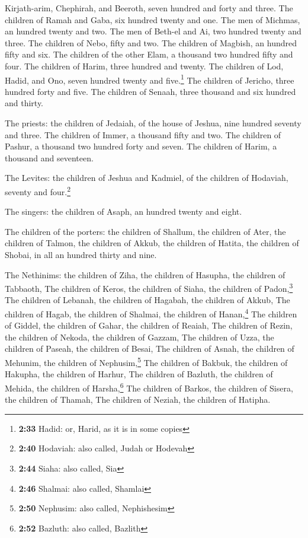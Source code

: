 Kirjath-arim, Chephirah, and Beeroth, seven hundred and forty and three.
 The children of Ramah and Gaba, six hundred twenty and
one.  The men of Michmas, an hundred twenty and two.
 The men of Beth-el and Ai, two hundred twenty and three.
 The children of Nebo, fifty and two.  The
children of Magbish, an hundred fifty and six.  The
children of the other Elam, a thousand two hundred fifty and four.
 The children of Harim, three hundred and twenty.
 The children of Lod, Hadid, and Ono, seven hundred
twenty and five.\footnote{\textbf{2:33} Hadid: or, Harid, as it is in
  some copies}  The children of Jericho, three hundred
forty and five.  The children of Senaah, three thousand
and six hundred and thirty.

 The priests: the children of Jedaiah, of the house of
Jeshua, nine hundred seventy and three.  The children of
Immer, a thousand fifty and two.  The children of Pashur,
a thousand two hundred forty and seven.  The children of
Harim, a thousand and seventeen.

 The Levites: the children of Jeshua and Kadmiel, of the
children of Hodaviah, seventy and four.\footnote{\textbf{2:40} Hodaviah:
  also called, Judah or Hodevah}

 The singers: the children of Asaph, an hundred twenty
and eight.

 The children of the porters: the children of Shallum,
the children of Ater, the children of Talmon, the children of Akkub, the
children of Hatita, the children of Shobai, in all an hundred thirty and
nine.

 The Nethinims: the children of Ziha, the children of
Hasupha, the children of Tabbaoth,  The children of
Keros, the children of Siaha, the children of Padon,\footnote{\textbf{2:44}
  Siaha: also called, Sia}  The children of Lebanah, the
children of Hagabah, the children of Akkub,  The children
of Hagab, the children of Shalmai, the children of Hanan,\footnote{\textbf{2:46}
  Shalmai: also called, Shamlai}  The children of Giddel,
the children of Gahar, the children of Reaiah,  The
children of Rezin, the children of Nekoda, the children of Gazzam,
 The children of Uzza, the children of Paseah, the
children of Besai,  The children of Asnah, the children
of Mehunim, the children of Nephusim,\footnote{\textbf{2:50} Nephusim:
  also called, Nephishesim}  The children of Bakbuk, the
children of Hakupha, the children of Harhur,  The
children of Bazluth, the children of Mehida, the children of
Harsha,\footnote{\textbf{2:52} Bazluth: also called, Bazlith}
 The children of Barkos, the children of Sisera, the
children of Thamah,  The children of Neziah, the children
of Hatipha.

